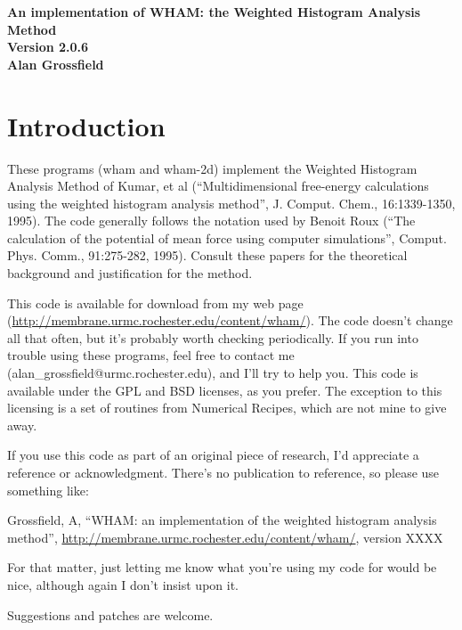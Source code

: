 \documentclass[12pt]{article}
\begin{document}
\begin{center}
\begin{LARGE}
{\bf An implementation of WHAM: the Weighted Histogram Analysis Method} \\
{\bf Version 2.0.6} \\
\vspace*{0.5in}
{\bf Alan Grossfield} \\
\end{LARGE}
\end{center}

\tableofcontents

\newpage

\section{Introduction}

These programs (wham and wham-2d) implement the Weighted Histogram
Analysis Method of Kumar, et al (``Multidimensional free-energy
calculations using the weighted histogram analysis method'',
J. Comput. Chem., 16:1339-1350, 1995).  The code generally
follows the notation used by Benoit Roux (``The calculation of the
potential of mean force using computer simulations'', Comput. Phys. Comm.,
91:275-282, 1995).  Consult these papers for the theoretical background
and justification for the method.

This code is available for download from my web page
(\url{http://membrane.urmc.rochester.edu/content/wham/}). The code doesn't
change all that often, but it's probably worth checking periodically.  If you
run into trouble using these programs, feel free to contact me
(alan\_grossfield@urmc.rochester.edu), and I'll try to help you.  This code
is available under the GPL and BSD licenses, as you prefer.  The exception to
this licensing is a set of routines from Numerical Recipes, which are not mine
to give away.  

If you use this code as part of an original piece of research, I'd
appreciate a reference or acknowledgment.  There's no publication to
reference, so please use something like:

\noindent
Grossfield, A, ``WHAM: an implementation of the weighted histogram analysis 
method'', \url{http://membrane.urmc.rochester.edu/content/wham/}, version
XXXX

\noindent For that matter, just letting me know what you're using my code for
would be nice, although again I don't insist upon it.

Suggestions and patches are welcome.  
\end{document}
